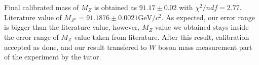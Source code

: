 Final calibrated mass of $M_Z$ is obtained as $91.17 \pm 0.02$ with $\chi^2 / ndf = 2.77$. Literature value of $M_{Z^0} = 91.1876 \pm 0.0021 \text{GeV/$c^2$}$\cite{pdg2018}. As expected, our error range is bigger than the literature value, however, $M_Z$ value we obtained stays inside the error range of  $M_Z$ value taken from literature. After this result, calibration accepted as done, and our result transfered to $W$ boson mass measurement part of the experiment by the tutor.

